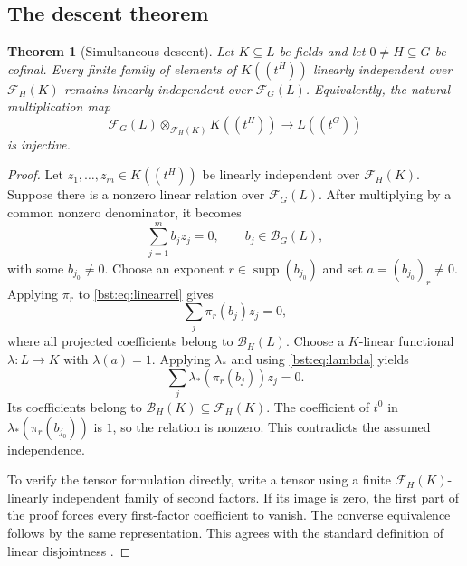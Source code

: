 \documentclass[11pt,letterpaper]{article}
\newtheorem{theorem}{Theorem}[section]
\theoremstyle{definition}
\theoremstyle{remark}
\newcommand{\supp}{\operatorname{supp}}
\newcommand{\HH}[2]{#1((t^{#2}))}
\newcommand{\BB}[2]{\mathcal B_{#2}(#1)}
\newcommand{\FF}[2]{\mathcal F_{#2}(#1)}
\begin{document}
\subsection{The descent theorem}

\begin{theorem}[Simultaneous descent]\label{bst:thm:descent}
Let $K\subseteq L$ be fields and let $0\ne H\subseteq G$ be cofinal.
Every finite family of elements of $\HH KH$ linearly independent over
$\FF KH$ remains linearly independent over $\FF LG$. Equivalently, the
natural multiplication map
\begin{equation}\label{bst:eq:tensor}
 \FF LG\otimes_{\FF KH}\HH KH\longrightarrow\HH LG
\end{equation}
is injective.
\end{theorem}
\begin{proof}
Let $z_1,\ldots,z_m\in\HH KH$ be linearly independent over $\FF KH$.
Suppose there is a nonzero linear relation over $\FF LG$. After multiplying
by a common nonzero denominator, it becomes
\begin{equation}\label{bst:eq:linearrel}
 \sum_{j=1}^m b_jz_j=0,\qquad b_j\in\BB LG,
\end{equation}
with some $b_{j_0}\ne0$. Choose an exponent $r\in\supp(b_{j_0})$ and set
$a=(b_{j_0})_r\ne0$. Applying $\pi_r$ to \eqref{bst:eq:linearrel} gives
\[
 \sum_j\pi_r(b_j)z_j=0,
\]
where all projected coefficients belong to $\BB LH$. Choose a $K$-linear
functional $\lambda:L\to K$ with $\lambda(a)=1$. Applying $\lambda_*$ and
using \eqref{bst:eq:lambda} yields
\[
 \sum_j\lambda_*(\pi_r(b_j))z_j=0.
\]
Its coefficients belong to $\BB KH\subseteq\FF KH$. The coefficient of
$t^0$ in $\lambda_*(\pi_r(b_{j_0}))$ is $1$, so the relation is nonzero.
This contradicts the assumed independence.

To verify the tensor formulation directly, write a tensor using a finite
$\FF KH$-linearly independent family of second factors. If its image is
zero, the first part of the proof forces every first-factor coefficient to
vanish. The converse equivalence follows by the same representation.
This agrees with the standard definition of linear disjointness
\cite{StacksLD}.
\end{proof}
\end{document}
